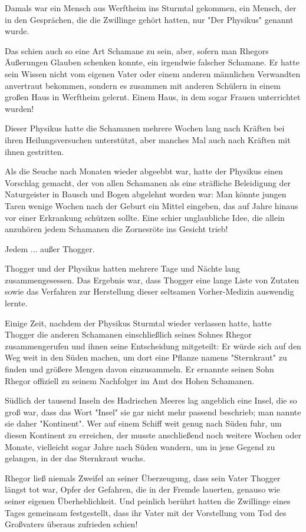 \documentclass[10pt, a4paper, oneside]{book}
\begin{document}
\begin{multicols}{2}
Damals war ein Mensch aus Werftheim ins Sturmtal gekommen, ein Mensch, der in den Gesprächen, die die Zwillinge gehört hatten, nur "Der Physikus" genannt wurde. 

Das schien auch so eine Art Schamane zu sein, aber, sofern man Rhegors Äußerungen Glauben schenken konnte, ein irgendwie falscher Schamane. Er hatte sein Wissen nicht vom eigenen Vater oder einem anderen männlichen Verwandten anvertraut bekommen, sondern es zusammen mit anderen Schülern in einem großen Haus in Werftheim gelernt. Einem Haus, in dem sogar Frauen unterrichtet wurden! 

Dieser Physikus hatte die Schamanen mehrere Wochen lang nach Kräften bei ihren Heilungsversuchen unterstützt, aber manches Mal auch nach Kräften mit ihnen gestritten. 

Als die Seuche nach Monaten wieder abgeebbt war, hatte der Physikus einen Vorschlag gemacht, der von allen Schamanen als eine sträfliche Beleidigung der Naturgeister in Bausch und Bogen abgelehnt worden war: Man könnte jungen Taren wenige Wochen nach der Geburt ein Mittel eingeben, das auf Jahre hinaus vor einer Erkrankung schützen sollte. Eine schier unglaubliche Idee, die allein anzuhören jedem Schamanen die Zornesröte ins Gesicht trieb! 

Jedem ... außer Thogger. 

Thogger und der Physikus hatten mehrere Tage und Nächte lang zusammengesessen. Das Ergebnis war, dass Thogger eine lange Liste von Zutaten sowie das Verfahren zur Herstellung dieser seltsamen Vorher-Medizin auswendig lernte. 

Einige Zeit, nachdem der Physikus Sturmtal wieder verlassen hatte, hatte Thogger die anderen Schamanen einschließlich seines Sohnes Rhegor zusammengerufen und ihnen seine Entscheidung mitgeteilt: Er würde sich auf den Weg weit in den Süden machen, um dort eine Pflanze namens "Sternkraut" zu finden und größere Mengen davon einzusammeln. Er ernannte seinen Sohn Rhegor offiziell zu seinem Nachfolger im Amt des Hohen Schamanen. 

Südlich der tausend Inseln des Hadrischen Meeres lag angeblich eine Insel, die so groß war, dass das Wort "Insel" sie gar nicht mehr passend beschrieb; man nannte sie daher "Kontinent". Wer auf einem Schiff weit genug nach Süden fuhr, um diesen Kontinent zu erreichen, der musste anschließend noch weitere Wochen oder Monate, vielleicht sogar Jahre nach Süden wandern, um in jene Gegend zu gelangen, in der das Sternkraut wuchs. 

Rhegor ließ niemals Zweifel an seiner Überzeugung, dass sein Vater Thogger längst tot war, Opfer der Gefahren, die in der Fremde lauerten, genauso wie seiner eigenen Überheblichkeit. Und peinlich berührt hatten die Zwillinge eines Tages gemeinsam festgestellt, dass ihr Vater mit der Vorstellung vom Tod des Großvaters überaus zufrieden schien! 


\end{multicols}
\end{document}
